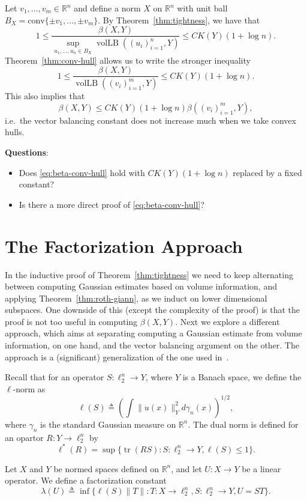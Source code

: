 \documentclass[12pt]{article}
\newcommand{\R}{{\mathbb{R}}}
\newcommand{\eqdef}{\triangleq}
\DeclareMathOperator{\vollb}{volLB}
\DeclareMathOperator{\tr}{tr}
\begin{document}
Let $v_1, \ldots, v_m \in \R^n$ and define a norm $X$ on $\R^n$ with
unit ball $B_X = \mathrm{conv}\{\pm v_1, \ldots, \pm v_m\}$. By
Theorem~\ref{thm:tightness}, we have that 
\[
1 \le \frac{\beta(X, Y)}{\sup_{u_1, \ldots, u_n \in
    B_X}\vollb((u_i)_{i = 1}^n, Y)} \le C K(Y)(1+\log n).
\]
Theorem~\ref{thm:conv-hull} allows us to write the stronger inequality
\[
1 \le \frac{\beta(X, Y)}{\vollb((v_i)_{i = 1}^m, Y)} \le C K(Y)(1+\log n).
\]
This also implies that
\begin{equation}\label{eq:beta-conv-hull}
\beta(X, Y) \le CK(Y)(1+\log n) \beta((v_i)_{i = 1}^m, Y),
\end{equation}
i.e.~the vector balancing constant does not increase much when we take
convex hulls. 

\medskip\noindent
\textbf{Questions}:
\begin{itemize}
\item Does \eqref{eq:beta-conv-hull} hold with $CK(Y)(1+\log n)$
  replaced by a fixed constant?
\item Is there a more direct proof of \eqref{eq:beta-conv-hull}?
\end{itemize}

\section{The Factorization Approach}

In the inductive proof of Theorem~\ref{thm:tightness} we need to keep
alternating between computing Gaussian estimates based on volume
information, and applying Theorem~\ref{thm:roth-giann}, as we induct on
lower dimensional subspaces. One downside of this (except the
complexity of the proof) is that the proof is not too useful in
computing $\beta(X, Y)$. Next we explore a different approach, which
aims at separating computing a Gaussian estimate from volume
information, on one hand, and the vector balancing argument on the
other. The approach is a (significant) generalization of the one used
in~\cite{disc-gamma2}. 

Recall that for an operator $S:\ell_2^n \to Y$, where $Y$ is a Banach
space, we define the $\ell$-norm as
\[
\ell(S) \eqdef \left( \int \|u(x)\|_Y^2 d\gamma_n(x) \right)^{1/2},
\]
where $\gamma_n$ is the standard Gaussian measure on $\R^n$. The dual
norm is defined for an opartor $R: Y \to \ell_2^n$ by 
\[
\ell^*(R) = \sup\{\tr(RS): S: \ell_2^n \to Y, \ell(S) \le 1\}.
\]

Let $X$ and $Y$ be normed spaces defined on $\R^n$, and let $U:X \to
Y$ be a linear operator. We define a factorization constant
\[
\lambda(U) \eqdef \inf \{\ell(S)\|T\|: T: X \to \ell_2^n, S: \ell_2^n
\to Y, U = ST\}.
\]
\end{document}
